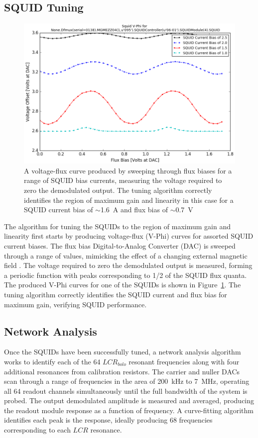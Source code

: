 \documentclass[iop]{emulateapj}
\begin{document}
\subsection{SQUID Tuning}

\begin{figure}
	\includegraphics[width=\linewidth]{squid}
	\centering
	\caption{A voltage-flux curve produced by sweeping through flux biases for a range of SQUID bias currents, measuring the voltage required to zero the demodulated output.  The tuning algorithm correctly identifies the region of maximum gain and linearity in this case for a SQUID current bias of $\sim$1.6~A and flux bias of $\sim$0.7~V}
	\label{vphi}
\end{figure}

The algorithm for tuning the SQUIDs to the region of maximum gain and linearity first starts by producing voltage-flux (V-Phi) curves for assorted SQUID current biases.  The flux bias Digital-to-Analog Converter (DAC) is sweeped through a range of values, mimicking the effect of a changing external magnetic field \citep{bender_digital_2014}.  The voltage required to zero the demodulated output is measured, forming a periodic function with peaks corresponding to 1/2 of the SQUID flux quanta.  The produced V-Phi curves for one of the SQUIDs is shown in Figure~\ref{vphi}.  The tuning algorithm correctly identifies the SQUID current and flux bias for maximum gain, verifying SQUID performance.

\subsection{Network Analysis}

Once the SQUIDs have been successfully tuned, a network analysis algorithm works to identify each of the 64 $LCR_{bolo}$ resonant frequencies along with four additional resonances from calibration resistors.  The carrier and nuller DACs scan through a range of frequencies in the area of 200~kHz to 7~MHz, operating all 64 readout channels simultaneously until the full bandwidth of the system is probed.  The output demodulated amplitude is measured and averaged, producing the readout module response as a function of frequency.  A curve-fitting algorithm identifies each peak is the response, ideally producing 68 frequencies corresponding to each $LCR$ resonance.  
\end{document}
